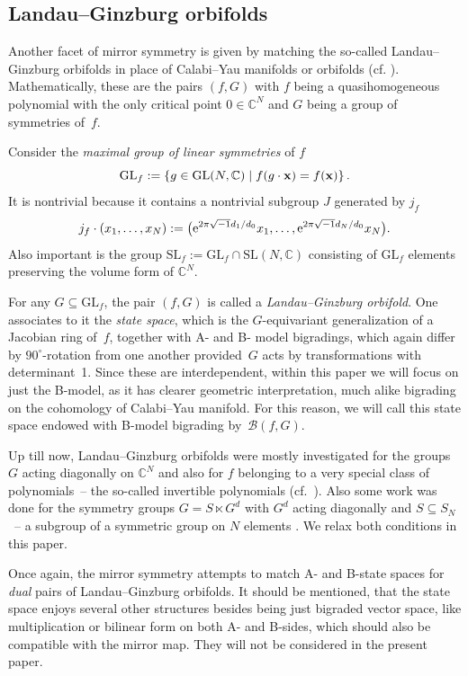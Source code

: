 \documentclass[pdftex]{sigma}
\numberwithin{equation}{section}
\newcommand{\CC}{{\mathbb{C}}}
\newcommand{\SL}{{\mathrm{SL}}}
\newcommand{\GL}{{\mathrm{GL}}}
\newcommand{\bx}{{\bf x}}
\def\B{{\mathcal B}}
\begin{document}
\subsection{Landau--Ginzburg orbifolds}
Another facet of mirror symmetry is given by matching the so-called Landau--Ginzburg orbifolds in place of Calabi--Yau manifolds or orbifolds (cf. \cite{IV90,Kreu94,S20,V89,W93}). Mathematically, these are the pairs $(f,G)$ with $f$ being a quasihomogeneous polynomial with the only critical point $0 \in \CC^N$ and $G$ being a group of symmetries of~$f$.

Consider the \textit{maximal group of linear symmetries} of $f$
\[
	\GL_f := \left\lbrace g \in \GL(N,\CC) \mid f(g \cdot \bx ) = f(\bx) \right\rbrace.
\]
It is nontrivial because it contains a nontrivial subgroup $J$ generated by $j_f$
\[
	j_f \cdot (x_1,\dots,x_N) := \bigl({\rm e}^{2 \pi \sqrt{-1} d_1/d_0} x_1,\dots, {\rm e}^{2 \pi \sqrt{-1} d_N/d_0}x_N\bigr).
\]
Also important is the group $\SL_f := \GL_f \cap \SL(N,\CC)$ consisting of $\GL_f$ elements preserving the volume form of $\CC^N$.

For any $G \subseteq \GL_f$, the pair $(f,G)$ is called a \textit{Landau--Ginzburg orbifold}. One associates to it the \textit{state space}, which is the $G$-equivariant generalization of a Jacobian ring of~$f$, together with A- and B- model bigradings, which again differ by $90^\circ$-rotation from one another provided~$G$ acts by transformations with determinant~1. Since these are interdependent, within this paper we will focus on just the B-model, as it has clearer geometric interpretation, much alike bigrading on the cohomology of Calabi--Yau manifold. For this reason, we will call this state space endowed with B-model bigrading by~$\B(f,G)$.

Up till now, Landau--Ginzburg orbifolds were mostly investigated for the groups $G$ acting diagonally on $\CC^N$ and also for $f$ belonging to a very special class of polynomials~-- the so-called invertible polynomials (cf.\ \cite{BT2,BTW17,BTW16,FJJS,K03,K06,K09}). Also some work was done for the symmetry groups $G = S \ltimes G^d$ with $G^d$ acting diagonally and $S \subseteq S_N$~-- a subgroup of a symmetric group on $N$ elements \cite{BI21,BI22,CJMPW23,EGZ20,EGZ18,I23,MO70,WWP,Y16}.
We relax both conditions in this paper.

Once again, the mirror symmetry attempts to match A- and B-state spaces for {\itshape dual} pairs of Landau--Ginzburg orbifolds. It should be mentioned, that the state space enjoys several other structures besides being just bigraded vector space, like multiplication or bilinear form on both A- and B-sides, which should also be compatible with the mirror map. They will not be considered in the present paper.
\end{document}
